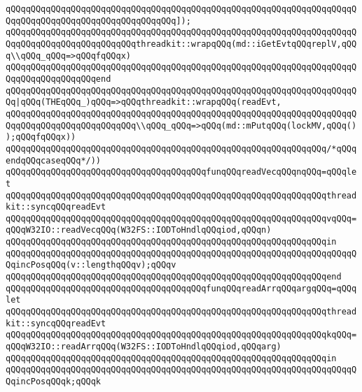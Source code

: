 \verb|qQQqqQQqqQQqqQQqqQQqqQQqqQQqqQQqqQQqqQQqqQQqqQQqqQQqqQQqqQQqqQQqqQQqqQQqqQQqqQQqqQQqqQQqqQQqqQQqqQQqqQQq]);|\newline
\verb|qQQqqQQqqQQqqQQqqQQqqQQqqQQqqQQqqQQqqQQqqQQqqQQqqQQqqQQqqQQqqQQqqQQqqQQqqQQqqQQqqQQqqQQqqQQqqQQqthreadkit::wrapqQQq(md::iGetEvtqQQqreplV,qQQq\\qQQq_qQQq=>qQQqfqQQqx)|\newline
\verb|qQQqqQQqqQQqqQQqqQQqqQQqqQQqqQQqqQQqqQQqqQQqqQQqqQQqqQQqqQQqqQQqqQQqqQQqqQQqqQQqqQQqqQQqend|\newline
\verb|qQQqqQQqqQQqqQQqqQQqqQQqqQQqqQQqqQQqqQQqqQQqqQQqqQQqqQQqqQQqqQQqqQQqqQQq|\verb#|qQQq(THEqQQq_)qQQq=>qQQqthreadkit::wrapqQQq(readEvt,#\newline
\verb|qQQqqQQqqQQqqQQqqQQqqQQqqQQqqQQqqQQqqQQqqQQqqQQqqQQqqQQqqQQqqQQqqQQqqQQqqQQqqQQqqQQqqQQqqQQqqQQq\\qQQq_qQQq=>qQQq(md::mPutqQQq(lockMV,qQQq());qQQqfqQQqx))|\newline
\verb|qQQqqQQqqQQqqQQqqQQqqQQqqQQqqQQqqQQqqQQqqQQqqQQqqQQqqQQqqQQqqQQq/*qQQqendqQQqcaseqQQq*/))|\newline
\verb|qQQqqQQqqQQqqQQqqQQqqQQqqQQqqQQqqQQqqQQqfunqQQqreadVecqQQqnqQQq=qQQqlet|\newline
\verb|qQQqqQQqqQQqqQQqqQQqqQQqqQQqqQQqqQQqqQQqqQQqqQQqqQQqqQQqqQQqqQQqthreadkit::syncqQQqreadEvt|\newline
\verb|qQQqqQQqqQQqqQQqqQQqqQQqqQQqqQQqqQQqqQQqqQQqqQQqqQQqqQQqqQQqqQQqvqQQq=qQQqW32IO::readVecqQQq(W32FS::IODToHndlqQQqiod,qQQqn)|\newline
\verb|qQQqqQQqqQQqqQQqqQQqqQQqqQQqqQQqqQQqqQQqqQQqqQQqqQQqqQQqqQQqqQQqin|\newline
\verb|qQQqqQQqqQQqqQQqqQQqqQQqqQQqqQQqqQQqqQQqqQQqqQQqqQQqqQQqqQQqqQQqqQQqqQQqincPosqQQq(v::lengthqQQqv);qQQqv|\newline
\verb|qQQqqQQqqQQqqQQqqQQqqQQqqQQqqQQqqQQqqQQqqQQqqQQqqQQqqQQqqQQqqQQqend|\newline
\verb|qQQqqQQqqQQqqQQqqQQqqQQqqQQqqQQqqQQqqQQqfunqQQqreadArrqQQqargqQQq=qQQqlet|\newline
\verb|qQQqqQQqqQQqqQQqqQQqqQQqqQQqqQQqqQQqqQQqqQQqqQQqqQQqqQQqqQQqqQQqthreadkit::syncqQQqreadEvt|\newline
\verb|qQQqqQQqqQQqqQQqqQQqqQQqqQQqqQQqqQQqqQQqqQQqqQQqqQQqqQQqqQQqqQQqkqQQq=qQQqW32IO::readArrqQQq(W32FS::IODToHndlqQQqiod,qQQqarg)|\newline
\verb|qQQqqQQqqQQqqQQqqQQqqQQqqQQqqQQqqQQqqQQqqQQqqQQqqQQqqQQqqQQqqQQqin|\newline
\verb|qQQqqQQqqQQqqQQqqQQqqQQqqQQqqQQqqQQqqQQqqQQqqQQqqQQqqQQqqQQqqQQqqQQqqQQqincPosqQQqk;qQQqk|\newline
